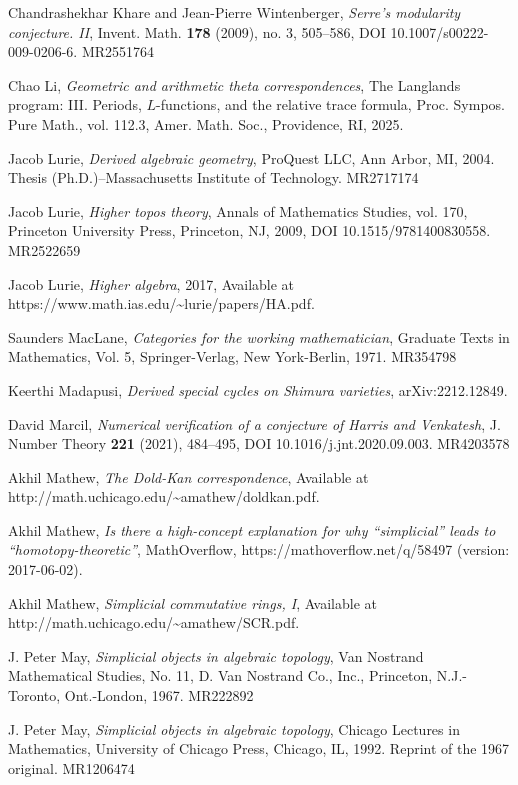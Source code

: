 \begin{refs}
\item[{[KW09]}] Chandrashekhar Khare and Jean-Pierre Wintenberger, \emph{Serre's modularity conjecture. II}, Invent. Math. \textbf{178} (2009), no. 3, 505--586, DOI 10.1007/s00222-009-0206-6. MR2551764
\item[{[Li25]}] Chao Li, \emph{Geometric and arithmetic theta correspondences}, The Langlands program: III. Periods, $L$-functions, and the relative trace formula, Proc. Sympos. Pure Math., vol. 112.3, Amer. Math. Soc., Providence, RI, 2025.
\item[{[Lur04]}] Jacob Lurie, \emph{Derived algebraic geometry}, ProQuest LLC, Ann Arbor, MI, 2004. Thesis (Ph.D.)--Massachusetts Institute of Technology. MR2717174
\item[{[Lur09]}] Jacob Lurie, \emph{Higher topos theory}, Annals of Mathematics Studies, vol. 170, Princeton University Press, Princeton, NJ, 2009, DOI 10.1515/9781400830558. MR2522659
\item[{[Lur17]}] Jacob Lurie, \emph{Higher algebra}, 2017, Available at https://www.math.ias.edu/\textasciitilde lurie/papers/HA.pdf.
\item[{[Mac71]}] Saunders MacLane, \emph{Categories for the working mathematician}, Graduate Texts in Mathematics, Vol. 5, Springer-Verlag, New York-Berlin, 1971. MR354798
\item[{[Mad23]}] Keerthi Madapusi, \emph{Derived special cycles on Shimura varieties}, arXiv:2212.12849.
\item[{[Mar21]}] David Marcil, \emph{Numerical verification of a conjecture of Harris and Venkatesh}, J. Number Theory \textbf{221} (2021), 484--495, DOI 10.1016/j.jnt.2020.09.003. MR4203578
\item[{[Mata]}] Akhil Mathew, \emph{The Dold-Kan correspondence}, Available at http://math.uchicago.edu/\textasciitilde amathew/doldkan.pdf.
\item[{[Matb]}] Akhil Mathew, \emph{Is there a high-concept explanation for why ``simplicial'' leads to ``homotopy-theoretic''}, MathOverflow, https://mathoverflow.net/q/58497 (version: 2017-06-02).
\item[{[Matc]}] Akhil Mathew, \emph{Simplicial commutative rings, I}, Available at http://math.uchicago.edu/\textasciitilde amathew/SCR.pdf.
\item[{[May67]}] J. Peter May, \emph{Simplicial objects in algebraic topology}, Van Nostrand Mathematical Studies, No. 11, D. Van Nostrand Co., Inc., Princeton, N.J.-Toronto, Ont.-London, 1967. MR222892
\item[{[May92]}] J. Peter May, \emph{Simplicial objects in algebraic topology}, Chicago Lectures in Mathematics, University of Chicago Press, Chicago, IL, 1992. Reprint of the 1967 original. MR1206474


\end{refs}
